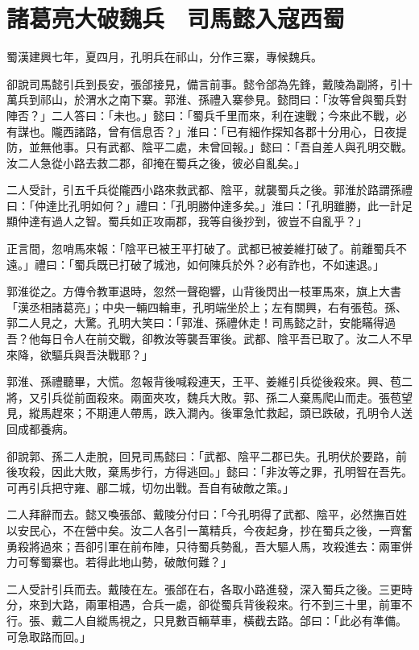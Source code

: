 
\chapter{諸葛亮大破魏兵　司馬懿入寇西蜀}

蜀漢建興七年，夏四月，孔明兵在祁山，分作三寨，專候魏兵。

卻說司馬懿引兵到長安，張郃接見，備言前事。懿令郃為先鋒，戴陵為副將，引十萬兵到祁山，於渭水之南下寨。郭淮、孫禮入寨參見。懿問曰：「汝等曾與蜀兵對陣否？」二人答曰：「未也。」懿曰：「蜀兵千里而來，利在速戰；今來此不戰，必有謀也。隴西諸路，曾有信息否？」淮曰：「已有細作探知各郡十分用心，日夜提防，並無他事。只有武都、陰平二處，未曾回報。」懿曰：「吾自差人與孔明交戰。汝二人急從小路去救二郡，卻掩在蜀兵之後，彼必自亂矣。」

二人受計，引五千兵從隴西小路來救武都、陰平，就襲蜀兵之後。郭淮於路謂孫禮曰：「仲達比孔明如何？」禮曰：「孔明勝仲達多矣。」淮曰：「孔明雖勝，此一計足顯仲達有過人之智。蜀兵如正攻兩郡，我等自後抄到，彼豈不自亂乎？」

正言間，忽哨馬來報：「陰平已被王平打破了。武都已被姜維打破了。前離蜀兵不遠。」禮曰：「蜀兵既已打破了城池，如何陳兵於外？必有詐也，不如速退。」

郭淮從之。方傳令教軍退時，忽然一聲砲響，山背後閃出一枝軍馬來，旗上大書「漢丞相諸葛亮」；中央一輛四輪車，孔明端坐於上；左有關興，右有張苞。孫、郭二人見之，大驚。孔明大笑曰：「郭淮、孫禮休走！司馬懿之計，安能瞞得過吾？他每日令人在前交戰，卻教汝等襲吾軍後。武都、陰平吾已取了。汝二人不早來降，欲驅兵與吾決戰耶？」

郭淮、孫禮聽畢，大慌。忽報背後喊殺連天，王平、姜維引兵從後殺來。興、苞二將，又引兵從前面殺來。兩面夾攻，魏兵大敗。郭、孫二人棄馬爬山而走。張苞望見，縱馬趕來；不期連人帶馬，跌入澗內。後軍急忙救起，頭已跌破，孔明令人送回成都養病。

卻說郭、孫二人走脫，回見司馬懿曰：「武都、陰平二郡已失。孔明伏於要路，前後攻殺，因此大敗，棄馬步行，方得逃回。」懿曰：「非汝等之罪，孔明智在吾先。可再引兵把守雍、郿二城，切勿出戰。吾自有破敵之策。」

二人拜辭而去。懿又喚張郃、戴陵分付曰：「今孔明得了武都、陰平，必然撫百姓以安民心，不在營中矣。汝二人各引一萬精兵，今夜起身，抄在蜀兵之後，一齊奮勇殺將過來；吾卻引軍在前布陣，只待蜀兵勢亂，吾大驅人馬，攻殺進去：兩軍併力可奪蜀寨也。若得此地山勢，破敵何難？」

二人受計引兵而去。戴陵在左。張郃在右，各取小路進發，深入蜀兵之後。三更時分，來到大路，兩軍相遇，合兵一處，卻從蜀兵背後殺來。行不到三十里，前軍不行。張、戴二人自縱馬視之，只見數百輛草車，橫截去路。郃曰：「此必有準備。可急取路而回。」

